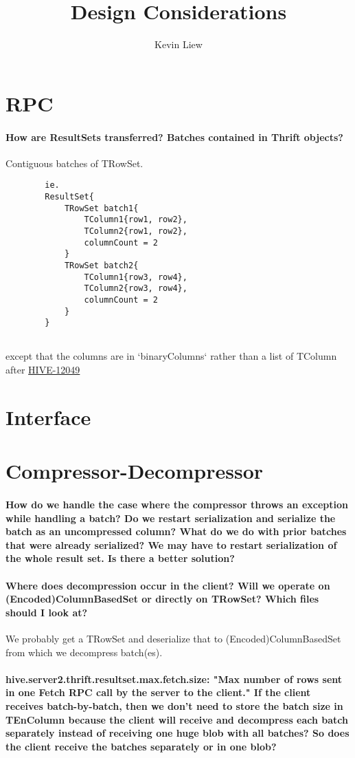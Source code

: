 \documentclass[11pt,a4paper]{article}
\title{Design Considerations}
\author{Kevin Liew}
\begin{document}
\maketitle

\section{RPC}
	\paragraph{How are ResultSets transferred? Batches contained in Thrift objects?}
	Contiguous batches of TRowSet.
	\begin{verbatim}
		ie.
		ResultSet{
		    TRowSet batch1{
		        TColumn1{row1, row2},
		        TColumn2{row1, row2},
		        columnCount = 2
		    }
		    TRowSet batch2{
		        TColumn1{row3, row4},
		        TColumn2{row3, row4},
		        columnCount = 2
		    }
		}
		
	\end{verbatim}
	except that the columns are in `binaryColumns` rather than a list of TColumn after \href{https://issues.apache.org/jira/browse/HIVE-12049}{HIVE-12049}

\section{Interface}

\section{Compressor-Decompressor}
	\paragraph{How do we handle the case where the compressor throws an exception while handling a batch? Do we restart serialization and serialize the batch as an uncompressed column? What do we do with prior batches that were already serialized? We may have to restart serialization of the whole result set. Is there a better solution?}
	
	\paragraph{Where does decompression occur in the client? Will we operate on (Encoded)ColumnBasedSet or directly on TRowSet? Which files should I look at?}
	We probably get a TRowSet and deserialize that to (Encoded)ColumnBasedSet from which we decompress batch(es).
	
	\paragraph{hive.server2.thrift.resultset.max.fetch.size: "Max number of rows sent in one Fetch RPC call by the server to the client." If the client receives batch-by-batch, then we don't need to store the batch size in TEnColumn because the client will receive and decompress each batch separately instead of receiving one huge blob with all batches? So does the client receive the batches separately or in one blob?}
\end{document}
